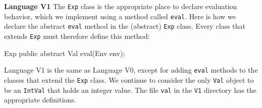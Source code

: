 \begin{minipage}[t]{\sw}
\slidenumber
\LARGE
{\bf Language V1}\exx
The \verb'Exp' class is the appropriate place
to declare evaluation behavior,
which we implement using a method called \verb'eval'.
Here is how we declare the abstract \verb'eval' method
in the (abstract) \verb'Exp' class.
Every class that extends \verb'Exp' must therefore define this method:
\begin{qv}
Exp
    public abstract Val eval(Env env);
\end{qv}
Language V1 is the same as Language V0,
except for adding \verb'eval' methods
to the classes that extend the \verb'Exp' class.
We continue to consider the only \verb'Val' object
to be an \verb'IntVal' that holds an integer value.
The file \verb'val' in the \verb'V1' directory
has the appropriate definitions.\exx
\end{minipage}
\clearpage
